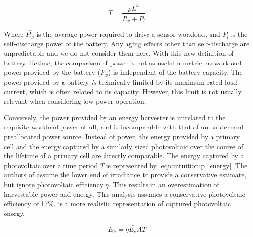 \begin{equation}
\label{eq:intuition:battery_life}
T = \frac{\rho L^3}{\bar{P_w} + P_l}
\end{equation}

\noindent Where $\bar{P_w}$ is the average power required to drive a sensor workload, and $P_l$ is the self-discharge power of the battery.
Any aging effects other than self-discharge are unpredictable and we do not consider them here.
With this new definition of battery lifetime, the comparison of power is not as useful a metric, as workload power provided by the battery ($P_w$) is independent of the battery capacity.
The power provided by a battery \textit{is} technically limited by its maximum rated load current, which is often related to its capacity.
However, this limit is not usually relevant when considering low power operation.

Conversely, the power provided by an energy harvester is unrelated to the requisite workload power at all, and is incomparable with that of an on-demand preallocated power source.
Instead of power, the energy provided by a primary cell and the energy captured by a similarly sized photovoltaic over the course of the lifetime of a primary cell are directly comparable.
The energy captured by a photovoltaic over a time period $T$ is represented by \cref{eqn:intuition:p_energy}.
The authors of \cite{yervaGrafting12} assume the lower end of irradiance to provide a conservative estimate, but ignore photovoltaic efficiency $\eta$. This results in an overestimation of harvestable power and energy.
This analysis assumes a conservative photovoltaic efficiency of 17\%.
 is a more realistic representation of captured photovoltaic energy.

\begin{equation} \label{eqn:intuition:p_energy}
E_h = \eta \bar{E_e} A T
\end{equation}



